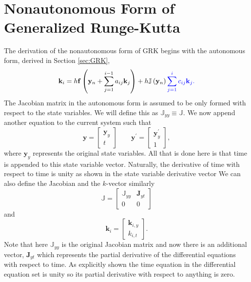 \documentclass{ansconf}
\numberwithin{equation}{section}
\begin{document}
\section{Nonautonomous Form of Generalized Runge-Kutta} \label{app:GRK_nonauto}
The derivation of the nonautonomous form of GRK begins with the autonomous form, derived in Section \ref{sec:GRK},
\begin{equation}
     \mathbf{k}_i = h\mathbf{f}\left(\mathbf{y}_n + \sum_{j=1}^{i-1}a_{ij}\mathbf{k}_j\right) +     
     h\mathbb{J}\left(\mathbf{y}_n\right) \color{blue}\sum_{j=1}^{i}c_{ij}\mathbf{k}_j.
\end{equation}
The Jacobian matrix in the autonomous form is assumed to be only formed with respect to the state variables. We will define this as $\mathbb{J}_{yy} \equiv \mathbb{J}$. We now append another equation to the current system such that
\begin{equation}
    \mathbf{y} = \left[ \begin{array}{c}
    \mathbf{y}_y \\
    t
    \end{array} \right ] \qquad
     \mathbf{y}^\prime = \left[ \begin{array}{c}
    \mathbf{y}_y^\prime \\
    1
    \end{array} \right ],
\end{equation}
where $\mathbf{y}_y$ represents the original state variables. All that is done here is that time is appended to this state variable vector. Naturally, the derivative of time with respect to time is unity as shown in the state variable derivative vector
We can also define the Jacobian and the $k$-vector similarly
  \begin{equation}
    \mathbb{J} = \left[ \begin{array}{cc}
    \mathbb{J}_{yy} & \mathbf{J}_{yt} \\
    0 & 0
    \end{array} \right]
  \end{equation}
  and
  \begin{equation}
    \mathbf{k}_i = \left[ \begin{array}{c}
    \mathbf{k}_{i,y} \\
    k_{i,t}
    \end{array} \right ].
  \end{equation}
Note that here $\mathbb{J}_{yy}$ is the original Jacobian matrix and now there is an additional vector, $\mathbf{J}_{yt}$ which represents the partial derivative of the differential equations with respect to time. As explicitly shown the time equation in the differential equation set is unity so its partial derivative with respect to anything is zero.
\end{document}
